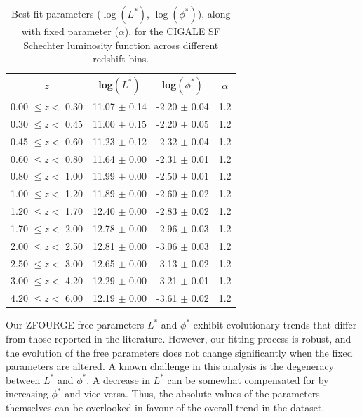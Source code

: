 \begin{table}[h]
    \caption{Best-fit parameters ($\log(L^*)$, $\log(\phi^*)$), along with fixed parameter ($\alpha$), for the CIGALE SF Schechter luminosity function across different redshift bins.}
    \label{Tab: Param Evo SF}
    \begin{center}
    \begin{tabular}{cccc}
        \toprule
        $z$ & log$(L^{*})$ & log$(\phi^{*})$ & $\alpha$ \\
        \hline
        0.00 $\leq z <$ 0.30 & 11.07 $\pm$ 0.14 & -2.20 $\pm$ 0.04 & 1.2 \\
        0.30 $\leq z <$ 0.45 & 11.00 $\pm$ 0.15 & -2.20 $\pm$ 0.05 & 1.2 \\
        0.45 $\leq z <$ 0.60 & 11.23 $\pm$ 0.12 & -2.32 $\pm$ 0.04 & 1.2 \\
        0.60 $\leq z <$ 0.80 & 11.64 $\pm$ 0.00 & -2.31 $\pm$ 0.01 & 1.2 \\
        0.80 $\leq z <$ 1.00 & 11.99 $\pm$ 0.00 & -2.50 $\pm$ 0.01 & 1.2 \\
        1.00 $\leq z <$ 1.20 & 11.89 $\pm$ 0.00 & -2.60 $\pm$ 0.02 & 1.2 \\
        1.20 $\leq z <$ 1.70 & 12.40 $\pm$ 0.00 & -2.83 $\pm$ 0.02 & 1.2 \\
        1.70 $\leq z <$ 2.00 & 12.78 $\pm$ 0.00 & -2.96 $\pm$ 0.03 & 1.2 \\
        2.00 $\leq z <$ 2.50 & 12.81 $\pm$ 0.00 & -3.06 $\pm$ 0.03 & 1.2 \\
        2.50 $\leq z <$ 3.00 & 12.65 $\pm$ 0.00 & -3.13 $\pm$ 0.02 & 1.2 \\
        3.00 $\leq z <$ 4.20 & 12.29 $\pm$ 0.00 & -3.21 $\pm$ 0.01 & 1.2 \\
        4.20 $\leq z <$ 6.00 & 12.19 $\pm$ 0.00 & -3.61 $\pm$ 0.02 & 1.2      
        \botrule
    \end{tabular}
    \end{center}
\end{table}

Our ZFOURGE free parameters $L^{*}$ and $\phi^{*}$ exhibit evolutionary trends that differ from those reported in the literature. However, our fitting process is robust, and the evolution of the free parameters does not change significantly when the fixed parameters are altered. A known challenge in this analysis is the degeneracy between $L^{*}$ and $\phi^{*}$. A decrease in $L^{*}$ can be somewhat compensated for by increasing $\phi^{*}$ and vice-versa. Thus, the absolute values of the parameters themselves can be overlooked in favour of the overall trend in the dataset. 

